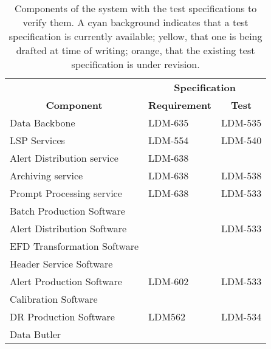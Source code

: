 \begin{longtable}{p{}p{}p{}}

\caption{Components of the \product{} system with the test specifications to verify them.
A cyan background indicates that a test specification is currently available; yellow, that one is being drafted at time of writing; orange, that the existing test specification is under revision.
\label{tab:testspecs}} \\

\toprule
                                       & \multicolumn{2}{c}{\textbf{Specification}} \\
\multicolumn{1}{c}{\textbf{Component}} & \multicolumn{1}{c}{\textbf{Requirement}} & \multicolumn{1}{c}{\textbf{Test}} \\
\toprule
Data Backbone                     & \cellcolor{dmorange} LDM-635 & \cellcolor{dmyellow} LDM-535 \\
LSP Services                      &   \cellcolor{dmblue} LDM-554 &   \cellcolor{dmblue} LDM-540 \\
Alert Distribution service        & \cellcolor{dmyellow} LDM-638 &                              \\
Archiving service                 & \cellcolor{dmyellow} LDM-638 &   \cellcolor{dmblue} LDM-538 \\
Prompt Processing service         & \cellcolor{dmyellow} LDM-638 &   \cellcolor{dmblue} LDM-533 \\
Batch Production Software         &                              &                              \\
Alert Distribution Software       &                              &   \cellcolor{dmblue} LDM-533 \\
EFD Transformation Software       &                              &                              \\
Header Service Software           &                              &                              \\
Alert Production Software         &   \cellcolor{dmblue} LDM-602 &   \cellcolor{dmblue} LDM-533 \\
Calibration Software              &                              &                              \\
DR Production Software            &    \cellcolor{dmblue} LDM562 &   \cellcolor{dmblue} LDM-534 \\
Data Butler                       &                              &                              \\

\end{longtable}
